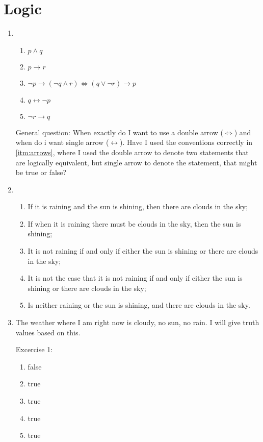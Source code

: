 \documentclass{article}
\begin{document}
\section{Logic}

\begin{enumerate}
    \item
        \begin{enumerate}
            \item $ p \land q $
            \item $ p \to r $
            \item \label{itm:arrows} $ \lnot p \to (\lnot q \land r) \Leftrightarrow (q \lor \lnot r) \to p $
            \item $ q \leftrightarrow \lnot p $
            \item $ \lnot r \to q $
        \end{enumerate}
        General question: When exactly do I want to use a double arrow
        ($\Leftrightarrow$) and when do i want single arrow
        ($\leftrightarrow$). Have I used the conventions correctly in
        \ref{itm:arrows}, where I used the double arrow to denote two
        statements that are logically equivalent, but single arrow to denote
        the statement, that might be true or false?
    \item
        \begin{enumerate}
            \item If it is raining and the sun is shining, then there are clouds in the sky;
            \item If when it is raining there must be clouds in the sky, then the sun is shining;
            \item It is not raining if and only if either the sun is shining or there are clouds in the sky;
            \item It is not the case that it is not raining if and only if either the sun is shining or there are clouds in the sky;
            \item Is neither raining or the sun is shining, and there are clouds in the sky.
        \end{enumerate}
    \item The weather where I am right now is cloudy, no sun, no rain. I will give truth values based on this.
        
        Excercise 1:
        \begin{enumerate}
            \item false
            \item true
            \item true
            \item true
            \item true
        \end{enumerate}


\end{enumerate}
\end{document}
